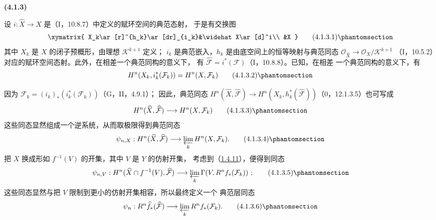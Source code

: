 \documentclass[UTF8,fontset=none,11pt,oneside,openany]{ctexbook}
\newenvironment{env}[1][]{%
  \par\medskip\noindent\textbf{(#1)}\ %
}{\par}
\newcommand{\oldpage}[2][]{%
  \hypertarget{ega-source-page-#1-#2}{}%
  \marginnote{\scriptsize\textbf{#1}~|~#2}\ignorespaces}
\let\EGAOriginalLabel\label
\renewcommand{\label}[1]{\phantomsection\EGAOriginalLabel{#1}}
\begin{document}
\begin{env}[4.1.3]
\label{III.4.1.3-fr}
设 $i:\widehat X\to X$ 是（I，10.8.7）中定义的赋环空间的典范态射，
于是有交换图
\[
\xymatrix{
X_k\ar[r]^{h_k}\ar[dr]_{i_k}&\widehat X\ar[d]^i\\
&X
}
\tag{4.1.3.1}\label{III.4.1.3.1-fr}
\]
其中 $X_k$ 是 $X$ 的闭子预概形，由理想 $\mathcal K^{k+1}$ 定义；
$i_k$ 是典范嵌入，$h_k$ 是由底空间上的恒等映射与典范同态
$\mathcal O_{\widehat X}\to\mathcal O_X/\mathcal K^{k+1}$
（I，10.5.2）对应的赋环空间态射。此外，在相差一个典范同构的意义下，
有 $\widehat{\mathcal F}=i^*(\mathcal F)$（I，10.8.8）。已知，在相差
一个典范同构的意义下，有
\[
H^n(X_k,i_k^*(\mathcal F_k))=H^n(X,\mathcal F_k)
\tag{4.1.3.2}\label{III.4.1.3.2-fr}
\]

\oldpage[III]{124}

因为 $\mathcal F_k=(i_k)_*(i_k^*(\mathcal F_k))$（G，II，4.9.1）；
因此，典范同态
$H^n(\widehat X,\widehat{\mathcal F})\to
H^n(X_k,h_k^*(\widehat{\mathcal F}))$（0，12.1.3.5）也可写成
\[
H^n(\widehat X,\widehat{\mathcal F})\longrightarrow H^n(X,\mathcal F_k)
\tag{4.1.3.3}\label{III.4.1.3.3-fr}
\]
这些同态显然组成一个逆系统，从而取极限得到典范同态
\[
\psi_{n,X}:H^n(\widehat X,\widehat{\mathcal F})
\longrightarrow\varprojlim_kH^n(X,\mathcal F_k).
\tag{4.1.3.4}\label{III.4.1.3.4-fr}
\]
把 $X$ 换成形如 $f^{-1}(V)$ 的开集，其中 $V$ 是 $Y$ 的仿射开集，
考虑到（\hyperref[III.1.4.11-fr]{1.4.11}），便得到同态
\[
\psi_{n,V}:H^n(\widehat X\cap f^{-1}(V),\widehat{\mathcal F})
\longrightarrow\varprojlim_k\Gamma(V,R^nf_*(\mathcal F_k))~;
\tag{4.1.3.5}\label{III.4.1.3.5-fr}
\]
这些同态显然与把 $V$ 限制到更小的仿射开集相容，所以最终定义一个
典范层同态
\[
\psi_n:R^n\widehat f_*(\widehat{\mathcal F})
\longrightarrow\varprojlim_kR^nf_*(\mathcal F_k).
\tag{4.1.3.6}\label{III.4.1.3.6-fr}
\]
\end{env}
\end{document}
